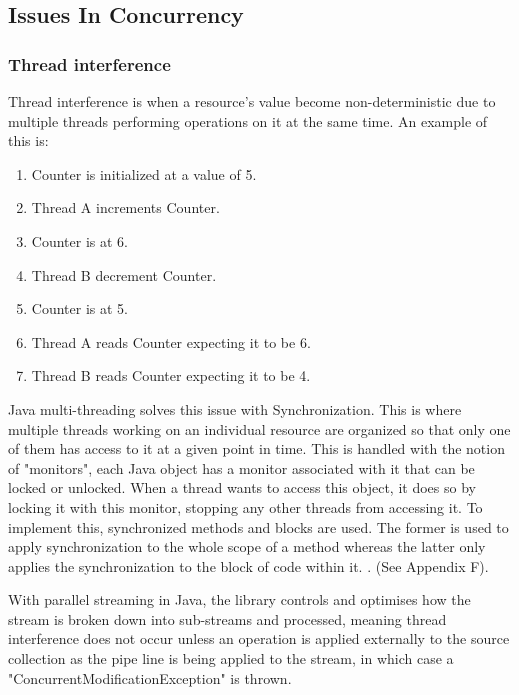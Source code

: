 \documentclass[]{report}
\begin{document}
\subsection{Issues In Concurrency}

\subsubsection{Thread interference}
Thread interference is when a resource's value become non-deterministic due to multiple threads performing operations on it at the same time\cite{Thread Interference}. An example of this is:

\begin{enumerate}[topsep=0pt,itemsep=-1ex,partopsep=1ex,parsep=1ex]
	\item Counter is initialized at a value of 5.
	\item Thread A increments Counter.
	\item Counter is at 6.
	\item Thread B decrement Counter.
	\item Counter is at 5.
	\item Thread A reads Counter expecting it to be 6.
	\item Thread B reads Counter expecting it to be 4.	
\end{enumerate}

Java multi-threading solves this issue with Synchronization. This is where multiple threads working on an individual resource are organized so that only one of them has access to it at a given point in time. This is handled with the notion of "monitors", each Java object has a monitor associated with it that can be locked or unlocked. When a thread wants to access this object, it does so by locking it with this monitor, stopping any other threads from accessing it. To implement this, synchronized methods and blocks are used. The former is used to apply synchronization to the whole scope of a method whereas the latter only applies the synchronization to the block of code within it. \cite{Synchronization}. (See Appendix F).

With parallel streaming in Java, the library controls and optimises how the stream is broken down into sub-streams and processed, meaning thread interference does not occur unless an operation is applied externally to the source collection as the pipe line is being applied to the stream, in which case a "ConcurrentModificationException" is thrown.\cite{Streaming Fork Join}
\end{document}
